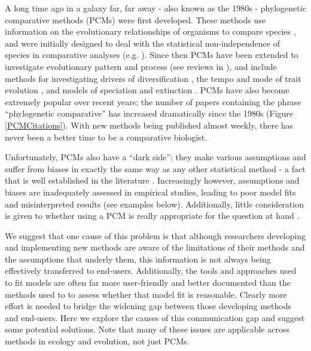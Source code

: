 \documentclass[a4paper,12pt]{article}
\begin{document}
A long time ago in a galaxy far, far away - also known as the 1980s - phylogenetic comparative methods (PCMs) were first developed. 
These methods use information on the evolutionary relationships of organisms to compare species \citep{harvey1991comparative}, and were initially designed to deal with the statistical non-independence of species in comparative analyses (e.g. \citealp{felsenstein1985phylogenies,grafen1989phylogenetic}).  
Since then PCMs have been extended to investigate evolutionary pattern and process (see reviews in \citealp{o2012evolutionary, pennell2013integrative}), and include methods for investigating drivers of diversification \citep[e.g.][]{maddison2007estimating}, the tempo and mode of trait evolution \citep[e.g.][]{o2012evolutionary}, and models of speciation and extinction \citep[e.g.][]{nee1994extinction}. 
PCMs have also become extremely popular over recent years; the number of papers containing the phrase ``phylogenetic comparative'' has increased dramatically since the 1980s (Figure \ref{PCMCitations}). 
With new methods being published almost weekly, there has never been a better time to be a comparative biologist.

Unfortunately, PCMs also have a ``dark side''; they make various assumptions and suffer from biases in exactly the same way as any other statistical method - a fact that is well established in the literature \citep[e.g.][]{freckleton2009seven,losos2011seeing,blomberg2012independent,boettiger2012your}.
Increasingly however, assumptions and biases are inadequately assessed in empirical studies, leading to poor model fits and misinterpreted results (see examples below).
Additionally, little consideration is given to whether using a PCM is really appropriate for the question at hand \citep{westoby1995misinterpreting,losos2011seeing}. 

We suggest that one cause of this problem is that although researchers developing and implementing new methods are aware of the limitations of their methods and the assumptions that underly them, this information is not always being effectively transferred to end-users.
Additionally, the tools and approaches used to fit models are often far more user-friendly and better documented than the methods used to to assess whether that model fit is reasonable. 
Clearly more effort is needed to bridge the widening gap between those developing methods and end-users. 
Here we explore the causes of this communication gap and suggest some potential solutions.
Note that many of these issues are applicable across methods in ecology and evolution, not just PCMs.
\end{document}
